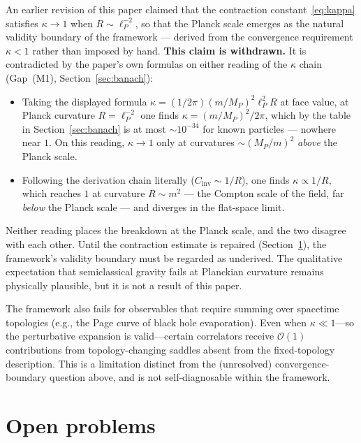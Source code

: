 \documentclass[12pt,a4paper]{article}
\begin{document}
An earlier revision of this paper claimed that the contraction
constant~\eqref{eq:kappa} satisfies $\kappa \to 1$ when $R \sim \ell_P^{-2}$, so that
the Planck scale emerges as the natural validity boundary of the framework --- derived
from the convergence requirement $\kappa < 1$ rather than imposed by hand. \textbf{This
claim is withdrawn.} It is contradicted by the paper's own formulas on either reading of
the $\kappa$ chain (Gap~(M1), Section~\ref{sec:banach}):

\begin{itemize}
\item Taking the displayed formula $\kappa = (1/2\pi)(m/M_P)^2\ell_P^2 R$ at face value,
at Planck curvature $R = \ell_P^{-2}$ one finds $\kappa = (m/M_P)^2/2\pi$, which by the
table in Section~\ref{sec:banach} is at most $\sim 10^{-34}$ for known particles ---
nowhere near $1$. On this reading, $\kappa \to 1$ only at curvatures
$\sim (M_P/m)^2$ \emph{above} the Planck scale.
\item Following the derivation chain literally ($C_{\mathrm{inv}} \sim 1/R$), one finds
$\kappa \propto 1/R$, which reaches $1$ at curvature $R \sim m^2$ --- the Compton scale
of the field, far \emph{below} the Planck scale --- and diverges in the flat-space limit.
\end{itemize}

\noindent Neither reading places the breakdown at the Planck scale, and the two disagree
with each other. Until the contraction estimate is repaired (Section~\ref{sec:open}),
the framework's validity boundary must be regarded as underived. The qualitative
expectation that semiclassical gravity fails at Planckian curvature remains physically
plausible, but it is not a result of this paper.

The framework also fails for observables that require summing over spacetime topologies
(e.g., the Page curve of black hole evaporation). Even when $\kappa \ll 1$---so the
perturbative expansion is valid---certain correlators receive $\mathcal{O}(1)$
contributions from topology-changing saddles absent from the fixed-topology
description. This is a limitation distinct from the (unresolved) convergence-boundary
question above, and is not self-diagnosable within the framework.

\section{Open problems}
\label{sec:open}
\end{document}
